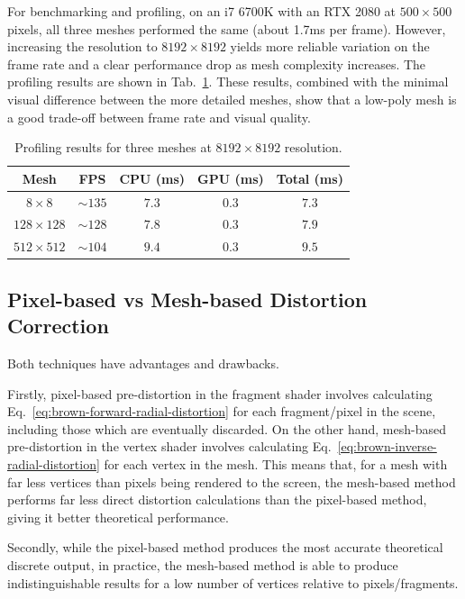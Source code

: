 For benchmarking and profiling, on an i7 6700K with an RTX 2080 at $500 \times 500$ pixels, all three meshes performed the same (about 1.7ms per frame).
However, increasing the resolution to $8192 \times 8192$ yields more reliable variation on the frame rate and a clear performance drop as mesh complexity increases.
The profiling results are shown in Tab.~\ref{tab:benchmarking}.
These results, combined with the minimal visual difference between the more detailed meshes, show that a low-poly mesh is a good trade-off between frame rate and visual quality.

\begin{table}[ht]
    \centering
    \caption{Profiling results for three meshes at $8192 \times 8192$ resolution.}
    \label{tab:benchmarking}
    \begin{tabular}{c|cccc}
    \textbf{Mesh}     & \textbf{FPS} & \textbf{CPU (ms)} & \textbf{GPU (ms)} & \textbf{Total (ms)} \\ \hline
    $8 \times 8$      & $\sim135$    & $7.3$             & $0.3$           & $7.3$                 \\
    $128 \times 128$  & $\sim128$    & $7.8$             & $0.3$           & $7.9$                 \\
    $512 \times 512$  & $\sim104$    & $9.4$             & $0.3$           & $9.5$                
    \end{tabular}
\end{table}

\subsection{Pixel-based vs Mesh-based Distortion Correction}\label{sec:pixel-vs-mesh-based}

Both techniques have advantages and drawbacks.

Firstly, pixel-based pre-distortion in the fragment shader involves calculating Eq.~\ref{eq:brown-forward-radial-distortion} for each fragment/pixel in the scene, including those which are eventually discarded.
On the other hand, mesh-based pre-distortion in the vertex shader involves calculating Eq.~\ref{eq:brown-inverse-radial-distortion} for each vertex in the mesh.
This means that, for a mesh with far less vertices than pixels being rendered to the screen, the mesh-based method performs far less direct distortion calculations than the pixel-based method, giving it better theoretical performance.

Secondly, while the pixel-based method produces the most accurate theoretical discrete output, in practice, the mesh-based method is able to produce indistinguishable results for a low number of vertices relative to pixels/fragments.


